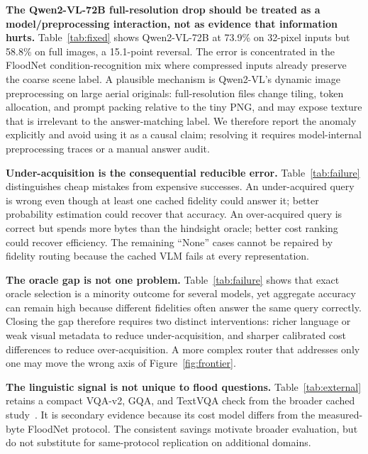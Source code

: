 \documentclass[10pt,conference]{IEEEtran}
\newcommand{\tableformat}{\footnotesize\setlength{\tabcolsep}{3.5pt}\renewcommand{\arraystretch}{0.95}}
\begin{document}
\noindent\textbf{The Qwen2-VL-72B full-resolution drop should be treated as a
model/preprocessing interaction, not as evidence that information hurts.}
Table~\ref{tab:fixed} shows Qwen2-VL-72B at 73.9\% on 32-pixel inputs but
58.8\% on full images, a 15.1-point reversal. The error is concentrated in the
FloodNet condition-recognition mix where compressed inputs already preserve the
coarse scene label. A plausible mechanism is Qwen2-VL's dynamic image
preprocessing on large aerial originals: full-resolution files change tiling,
token allocation, and prompt packing relative to the tiny PNG, and may expose
texture that is irrelevant to the answer-matching label. We therefore report
the anomaly explicitly and avoid using it as a causal claim; resolving it
requires model-internal preprocessing traces or a manual answer audit.

\noindent\textbf{Under-acquisition is the consequential reducible error.}
Table~\ref{tab:failure} distinguishes cheap mistakes from expensive successes.
An under-acquired query is wrong even though at least one cached fidelity could
answer it; better probability estimation could recover that accuracy. An
over-acquired query is correct but spends more bytes than the hindsight oracle;
better cost ranking could recover efficiency. The remaining ``None'' cases
cannot be repaired by fidelity routing because the cached VLM fails at every
representation.

\noindent\textbf{The oracle gap is not one problem.}
Table~\ref{tab:failure} shows that exact oracle selection is a minority outcome
for several models, yet aggregate accuracy can remain high because different
fidelities often answer the same query correctly. Closing the gap therefore
requires two distinct interventions: richer language or weak visual metadata
to reduce under-acquisition, and sharper calibrated cost differences to reduce
over-acquisition. A more complex router that addresses only one may move the
wrong axis of Figure~\ref{fig:frontier}.

\begin{table}[t]
\centering
\tableformat
\caption{Secondary external-validity evidence from a cached multi-dataset
study. Cost is its normalized acquisition proxy,
not measured FloodNet bytes, so it is not pooled with the primary results.}
\label{tab:external}

\end{table}

\noindent\textbf{The linguistic signal is not unique to flood questions.}
Table~\ref{tab:external} retains a compact VQA-v2, GQA, and TextVQA check from
the broader cached study~\cite{goyal2017vqav2,hudson2019gqa,singh2019textvqa}.
It is secondary evidence because its cost model differs from the measured-byte
FloodNet protocol. The consistent savings motivate broader evaluation, but do
not substitute for same-protocol replication on additional domains.
\end{document}
